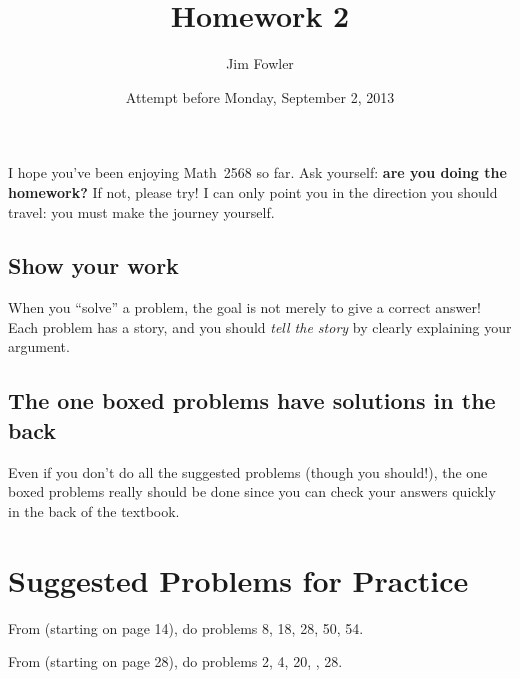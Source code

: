 \documentclass[12pt]{handout}
\title{Homework 2}
\date{Attempt before Monday, September  2, 2013}
\author{Jim Fowler}
\begin{document}
\maketitle


I hope you've been enjoying
Math~2568 so far.  Ask yourself:
\textbf{are you doing the homework?}  If not, please try!  I can only
point you in the direction you should travel: you must make the
journey yourself.






\subsection*{Show your work}
When you ``solve'' a problem, the goal is not merely to give a correct answer!  Each problem has a story, and you should \textit{tell the story} by clearly explaining your argument.


\subsection*{The one boxed problems have solutions in the back}
Even if you don't do all the suggested problems (though you should!), the one boxed problems really should be done since you can check your answers quickly in the back of the textbook.

\section*{Suggested Problems for Practice}

From  (starting on page 14),
do problems 8, 18, 28, 50, 54.
\vspace{1ex}

From  (starting on page 28),
do problems 2, 4, 20, , 28.
\vspace{1ex}
\end{document}
